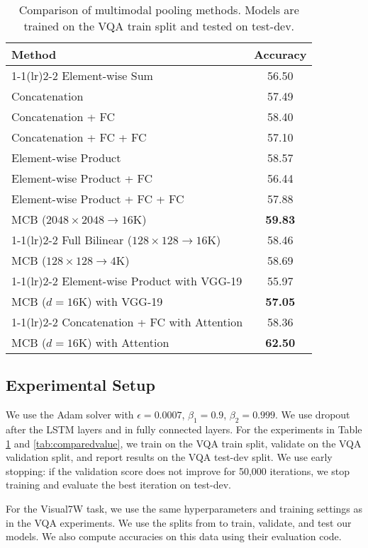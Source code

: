 \documentclass[11pt,letterpaper]{article}
\newcommand{\twocmidrule}{\cmidrule(lr){1-1}\cmidrule(lr){2-2}}
\begin{document}
\begin{table}
\centering
\begin{tabular}{lc}
\toprule
 \bf Method & \bf Accuracy \\ \twocmidrule
Element-wise Sum & 56.50 \\
Concatenation & 57.49 \\
Concatenation + FC & 58.40 \\
Concatenation + FC + FC & 57.10 \\
Element-wise Product & 58.57 \\
Element-wise Product + FC & 56.44 \\
Element-wise Product + FC + FC & 57.88 \\
MCB ($2048 \times 2048 \rightarrow 16$K) & \bf 59.83 \\
\twocmidrule
Full Bilinear ($128 \times 128 \rightarrow 16$K) & 58.46 \\
MCB ($128 \times 128 \rightarrow 4$K) & 58.69 \\
\twocmidrule
Element-wise Product with VGG-19 & 55.97 \\
MCB ($d=16$K) with VGG-19 & \bf 57.05 \\
\twocmidrule
Concatenation + FC with Attention & 58.36 \\
MCB ($d=16$K) with Attention & \bf 62.50 \\
\bottomrule
\end{tabular}
\caption{Comparison of multimodal pooling methods. Models are trained on the VQA train split and tested on test-dev.}
\label{tab:comparefusion}
\end{table}
\subsection{Experimental Setup}

We use the Adam solver with $\epsilon = 0.0007$, $\beta_1 = 0.9$, $\beta_2 = 0.999$. We use dropout after the LSTM layers and in fully connected layers. For the experiments in Table \ref{tab:comparefusion} and  \ref{tab:comparedvalue}, we train on the VQA train split, validate on the VQA validation split, and report results on the VQA test-dev split. We use early stopping: if the validation score does not improve for 50,000 iterations, we stop training and evaluate the best iteration on test-dev.

For the Visual7W task, we use the same hyperparameters and training settings as in the VQA experiments. We use the splits from \cite{zhu16cvpr} to train, validate, and test our models. We also compute accuracies on this data using their evaluation code.
\end{document}
